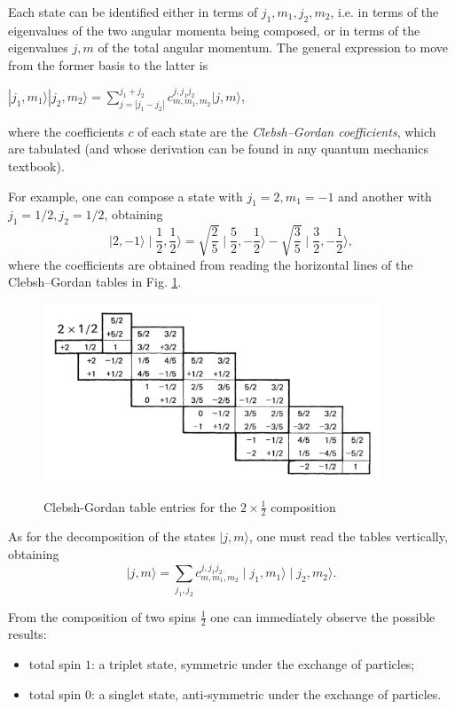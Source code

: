 Each state can be identified either in terms of \(j_1,m_1,j_2,m_2\), i.e. in terms of the eigenvalues of the two angular momenta being composed, or in terms of the eigenvalues \(j,m\) of the total angular momentum. 
The general expression to move from the former basis to the latter is
\begin{center}
      $|j_1 , m_1 \rangle |j_2 , m_2\rangle=\sum\limits_{j=|j_1-j_2|}^{j_{1}+j_{2}}c_{m,m_1 , m_2}^{j, j_1 j_2}|j,m\rangle$,
\end{center}
where the coefficients \(c\) of each state are the  \emph{Clebsh--Gordan coefficients}, which are tabulated (and whose derivation can be found in any quantum mechanics textbook). 

For example, one can compose a state with \(j_1=2,m_1=-1\) and another with \(j_1=1/2,j_2=1/2\), obtaining
\[\mid2 ,-1\rangle\mid\frac{1}{2} ,\frac{1}{2}\rangle=\sqrt{\frac{2}{5}}\mid\frac{5}{2} ,-\frac{1}{2} \rangle -\sqrt{\frac{3}{5}}\mid\frac{3}{2} ,-\frac{1}{2}\rangle,\]
where the coefficients are obtained from reading the horizontal lines of the Clebsh--Gordan tables in Fig. \ref{fig:clebsh1}.

\begin{figure}[h!]
\begin{center}
  \includegraphics[width=10cm]{Figures/Simmetrie-pagine-1.pdf}\label{fig:clebsh1}
  \caption{Clebsh-Gordan table entries for the $2\times \frac{1}{2}$ composition}
\end{center}
\end{figure}

As for the decomposition of the states $\mid j,m\rangle$, one must read the tables vertically, obtaining
\[|j,m\rangle=\sum\limits_{j_1 , j_2}c_{m,m_1 , m_2}^{j, j_1 j_2}\mid j_1 , m_1 \rangle \mid j_2 , m_2\rangle.
\]

From the composition of two spins $\frac{1}{2}$ one can immediately observe the possible results:
\begin{itemize}
    \item total spin \(1\): a triplet state, symmetric under the exchange of particles;
    \item total spin \(0\): a singlet state, anti-symmetric under the exchange of particles.
\end{itemize}

